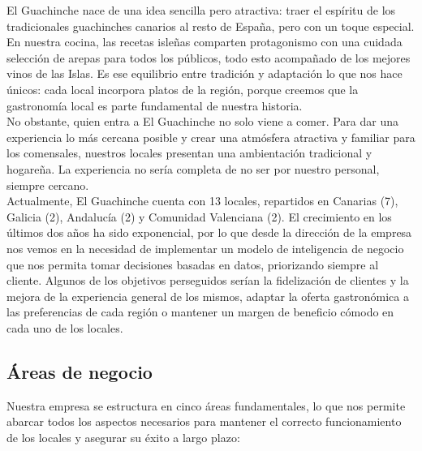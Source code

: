 \documentclass[12pt]{opticajnl}
\begin{document}
El Guachinche nace de una idea sencilla pero atractiva: traer el espíritu de los tradicionales guachinches canarios al resto de España, pero con un toque especial. En nuestra cocina, las recetas isleñas comparten protagonismo con una cuidada selección de arepas para todos los públicos, todo esto acompañado de los mejores vinos de las Islas. Es ese equilibrio entre tradición y adaptación lo que nos hace únicos: cada local incorpora platos de la región, porque creemos que la gastronomía local es parte fundamental de nuestra historia. \\

No obstante, quien entra a El Guachinche no solo viene a comer. Para dar una experiencia lo más cercana posible y crear una atmósfera atractiva y familiar para los comensales, nuestros locales presentan una ambientación tradicional y hogareña. La experiencia no sería completa de no ser por nuestro personal, siempre cercano. \\

Actualmente, El Guachinche cuenta con 13 locales, repartidos en Canarias (7), Galicia (2), Andalucía (2) y Comunidad Valenciana (2). El crecimiento en los últimos dos años ha sido exponencial, por lo que desde la dirección de la empresa nos vemos en la necesidad de implementar un modelo de inteligencia de negocio que nos permita tomar decisiones basadas en datos, priorizando siempre al cliente. Algunos de los objetivos perseguidos serían la fidelización de clientes y la mejora de la experiencia general de los mismos, adaptar la oferta gastronómica a las preferencias de cada región o mantener un margen de beneficio cómodo en cada uno de los locales. \\


\subsection{Áreas de negocio}
Nuestra empresa se estructura en cinco áreas fundamentales, lo que nos permite abarcar todos los aspectos necesarios para mantener el correcto funcionamiento de los locales y asegurar su éxito a largo plazo:
\end{document}
